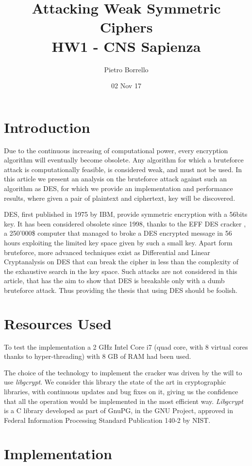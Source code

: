 \documentclass[11pt]{article}
\title{Attacking Weak Symmetric Ciphers \\ \bigskip \large HW1 - CNS Sapienza}
\author{Pietro Borrello}
\date{02 Nov 17}
\begin{document}
  \maketitle

  \section{Introduction}
  Due to the continuous increasing of computational power, every encryption algorithm will eventually become obsolete.
  Any algorithm for which a bruteforce attack is computationally feasible, is considered weak, and must not be used. In this article we present an analysis on the bruteforce attack against such an algorithm as DES, for which we provide an implementation and performance results, where given a pair of plaintext and ciphertext, key will be discovered.

  DES, first published in 1975 by IBM, provide symmetric encryption with a 56bits key. It has been considered obsolete since 1998, thanks to the EFF DES cracker \cite{descracker}, a 250'000\$ computer that managed to broke a DES encrypted message in 56 hours exploiting the limited key space given by such a small key. Apart form bruteforce, more advanced techniques exist as Differential and Linear Cryptanalysis on DES \cite{cryptanalysis} that can break the cipher in less than the complexity of the exhaustive search in the key space. Such attacks are not considered in this article, that has the aim to show that DES is breakable only with a dumb bruteforce attack. Thus providing the thesis that using DES should be foolish.

  \section{Resources Used}
  To test the implementation a 2 GHz Intel Core i7 (quad core, with 8 virtual cores thanks to hyper-threading) with 8 GB of RAM had been used.

  The choice of the technology to implement the cracker was driven by the will to use \textit{libgcrypt}. We consider this library the state of the art in cryptographic libraries, with continuous updates and bug fixes on it, giving us the confidence that all the operation would be implemented in the most efficient way. \textit{Libgcrypt} is a C library developed as part of GnuPG, in the GNU Project, approved in Federal Information Processing Standard Publication 140-2 by NIST.

  \section{Implementation}
\end{document}
